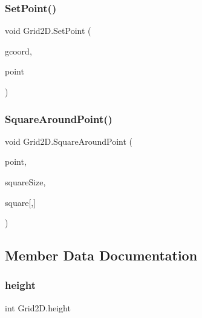 \mbox{\label{struct_grid2_d_a81023ffc43b01d97edf0ced5d946763c}} 
\subsubsection{\texorpdfstring{Set\+Point()}{SetPoint()}\hspace{0.1cm}{\footnotesize\ttfamily [2/2]}}
{\footnotesize\ttfamily void Grid2\+D.\+Set\+Point (\begin{DoxyParamCaption}\item[{\mbox{\hyperlink{struct_int_point}{Int\+Point}}}]{gcoord,  }\item[{Vector2}]{point }\end{DoxyParamCaption})}

\mbox{\label{struct_grid2_d_a992f70ddc78c3f9f5bc025f53cfc2059}} 
\subsubsection{\texorpdfstring{Square\+Around\+Point()}{SquareAroundPoint()}}
{\footnotesize\ttfamily void Grid2\+D.\+Square\+Around\+Point (\begin{DoxyParamCaption}\item[{\mbox{\hyperlink{struct_int_point}{Int\+Point}}}]{point,  }\item[{int}]{square\+Size,  }\item[{out Vector2}]{square\mbox{[},\mbox{]} }\end{DoxyParamCaption})}



\subsection{Member Data Documentation}
\mbox{\label{struct_grid2_d_ae7a732a224d7276592bbca106154016d}} 
\subsubsection{\texorpdfstring{height}{height}}
{\footnotesize\ttfamily int Grid2\+D.\+height}

